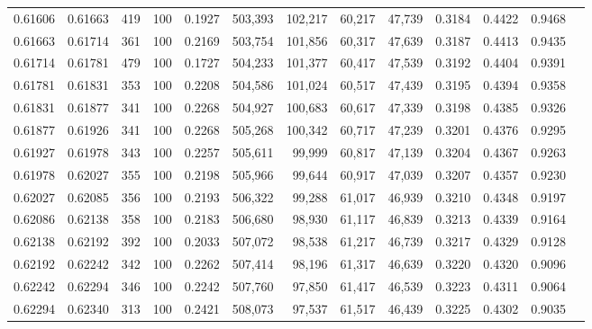 \begin{tabular}{rrrrrrrrrrrrr}
0.61606 & 0.61663 &   419 & 100 &                                     0.1927 & 503,393 & 102,217 &  60,217 &  47,739 & 0.3184 & 0.4422 & 0.9468 \\
0.61663 & 0.61714 &   361 & 100 &                                     0.2169 & 503,754 & 101,856 &  60,317 &  47,639 & 0.3187 & 0.4413 & 0.9435 \\
0.61714 & 0.61781 &   479 & 100 &                                     0.1727 & 504,233 & 101,377 &  60,417 &  47,539 & 0.3192 & 0.4404 & 0.9391 \\
0.61781 & 0.61831 &   353 & 100 &                                     0.2208 & 504,586 & 101,024 &  60,517 &  47,439 & 0.3195 & 0.4394 & 0.9358 \\
0.61831 & 0.61877 &   341 & 100 &                                     0.2268 & 504,927 & 100,683 &  60,617 &  47,339 & 0.3198 & 0.4385 & 0.9326 \\
0.61877 & 0.61926 &   341 & 100 &                                     0.2268 & 505,268 & 100,342 &  60,717 &  47,239 & 0.3201 & 0.4376 & 0.9295 \\
0.61927 & 0.61978 &   343 & 100 &                                     0.2257 & 505,611 &  99,999 &  60,817 &  47,139 & 0.3204 & 0.4367 & 0.9263 \\
0.61978 & 0.62027 &   355 & 100 &                                     0.2198 & 505,966 &  99,644 &  60,917 &  47,039 & 0.3207 & 0.4357 & 0.9230 \\
0.62027 & 0.62085 &   356 & 100 &                                     0.2193 & 506,322 &  99,288 &  61,017 &  46,939 & 0.3210 & 0.4348 & 0.9197 \\
0.62086 & 0.62138 &   358 & 100 &                                     0.2183 & 506,680 &  98,930 &  61,117 &  46,839 & 0.3213 & 0.4339 & 0.9164 \\
0.62138 & 0.62192 &   392 & 100 &                                     0.2033 & 507,072 &  98,538 &  61,217 &  46,739 & 0.3217 & 0.4329 & 0.9128 \\
0.62192 & 0.62242 &   342 & 100 &                                     0.2262 & 507,414 &  98,196 &  61,317 &  46,639 & 0.3220 & 0.4320 & 0.9096 \\
0.62242 & 0.62294 &   346 & 100 &                                     0.2242 & 507,760 &  97,850 &  61,417 &  46,539 & 0.3223 & 0.4311 & 0.9064 \\
0.62294 & 0.62340 &   313 & 100 &                                     0.2421 & 508,073 &  97,537 &  61,517 &  46,439 & 0.3225 & 0.4302 & 0.9035 \\

\end{tabular}
